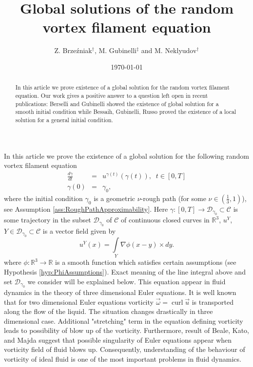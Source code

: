 \documentclass[11pt,a4paper,leqno]{amsart}%
\theoremstyle{plain}
\theoremstyle{remark}
\theoremstyle{plain}
\numberwithin{equation}{section}
\newcommand\curl{\operatorname{curl}}
\def\Rnu{{\mathbb R}}
\def\intl{\int\limits}
\begin{document}
\title{Global solutions of the random vortex filament equation}

\author{Z. Brze\'{z}niak$^\dag$, M. Gubinelli$^\ddag$ and
M. Neklyudov$^\dag$}

\address{
$^\dag$Department of Mathematics, University of York, Heslington,
UK
\\
$^\ddag$CEREMADE \& CNRS UMR 7534, Universit\'e Paris-Dauphine,  France
}
\date{}


\date{\today}

\begin{abstract}
In this article we prove existence of a global solution for the random
vortex filament equation. Our work gives a positive answer to a question left open in recent publications: Berselli and  Gubinelli \cite{[Bers+Gub_2007]}  showed the existence of global solution for a smooth  initial condition  while  Bessaih, Gubinelli, Russo \cite{[Bess+Gub_2005]} proved the existence of a local solution for a general  initial condition.
\end{abstract}


\maketitle

In this article we prove the existence of a global solution for the following random
vortex filament equation
\begin{eqnarray}
\frac{d\gamma}{dt} &=& u^{\gamma(t)}(\gamma(t)), \;\; t\in [0,T] \label{eqn:RandomFilam-1}\\
\gamma(0) &=& \gamma_0,\label{eqn:RandomFilam-2}
\end{eqnarray}
where the initial condition $\gamma_0$ is a  geometric $\nu$-rough path (for some  $\nu\in(\frac{1}{3},1)$),  see Assumption \ref{ass:RoughPathApproximability}. Here $\gamma:[0,T]\to \mathcal{D}_{\gamma_0}\subset\mathcal{C}$ is some trajectory in
the subset $\mathcal{D}_{\gamma_0}$ of $\mathcal{C}$ of continuous closed curves in
$\Rnu^3$, $u^Y$, $Y\in \mathcal{D}_{\gamma_0}\subset\mathcal{C}$ is a vector field
given by
\begin{equation}
u^Y(x)=\intl_Y\nabla\phi(x-y)\times dy.\label{eqn:RandomFilam-3}
\end{equation}
where $\phi:\Rnu^3\to\Rnu$ is a smooth function which satisfies
certain assumptions (see Hypothesis \ref{hyp:PhiAssumptions}).
Exact meaning of the line integral above and set $\mathcal{D}_{\gamma_0}$ we consider
will be explained below. This equation appear in fluid dynamics in
the theory of three dimensional Euler equations.
It is well known that for two dimensional Euler equations vorticity $\vec{\omega}=\curl \vec{u}$ is transported along the flow of the liquid.
The situation changes drastically in three dimensional case. Additional "stretching" term in the equation defining vorticity
leads to possibility of blow up of the vorticity.
Furthermore, result of Beale,
Kato, and Majda \cite{[BKM-1984]} suggest that possible
singularity of Euler equations appear when vorticity field of
fluid blows up. Consequently, understanding of the behaviour of vorticity of ideal fluid is
one of the most important problems in fluid dynamics.
\end{document}
